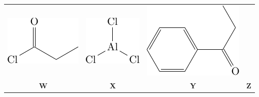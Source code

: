 \documentclass{article}
\begin{document}
	\begin{tabular}{cccc}
		\includegraphics{subfigures/propanoyl-chloride.pdf} & \includegraphics{subfigures/aluminum-chloride.pdf} & \includegraphics{intermediate-S.pdf} \\
		\textbf{W} & \textbf{X} & \textbf{Y} & \textbf{Z}
	\end{tabular}
\end{document}
